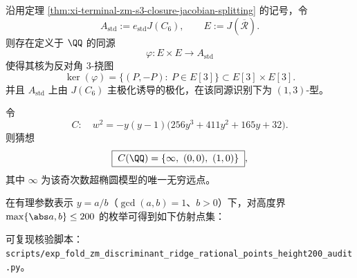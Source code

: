 \begin{conjecture}[标准因子的图核极化刚性]\label{conj:xi-terminal-zm-standard-factor-graph-kernel-3torsion}
沿用定理 \ref{thm:xi-terminal-zm-s3-closure-jacobian-splitting} 的记号，令
\[
A_{\mathrm{std}}:=e_{\mathrm{std}}J(C_6),\qquad
E:=J(\overline{\mathcal R}).
\]
则存在定义于 \(\QQ\) 的同源
\[
\varphi:E\times E\longrightarrow A_{\mathrm{std}}
\]
使得其核为反对角 \(3\)-挠图
\[
\ker(\varphi)=\{(P,-P):\ P\in E[3]\}\subset E[3]\times E[3].
\]
并且 \(A_{\mathrm{std}}\) 上由 \(J(C_6)\) 主极化诱导的极化，在该同源识别下为 \((1,3)\)-型。
\end{conjecture}

\begin{conjecture}[判别式二次脊曲线的有理点完全刻画]\label{conj:xi-terminal-zm-discriminant-ridge-rational-points}
令
\[
C:\quad w^{2}=-y(y-1)\bigl(256y^{3}+411y^{2}+165y+32\bigr).
\]
则猜想
\[
\boxed{\;
C(\QQ)=\{\infty,\ (0,0),\ (1,0)\}\; },
\]
其中 \(\infty\) 为该奇次数超椭圆模型的唯一无穷远点。
\end{conjecture}

\begin{remark}[有限高度穷举证据]\label{rem:xi-terminal-zm-discriminant-ridge-rational-points-height-audit}
在有理参数表示 \(y=a/b\)（\(\gcd(a,b)=1\)、\(b>0\)）下，对高度界 \(\max\{\abs a,b\}\le 200\) 的枚举可得到如下仿射点集：

可复现核验脚本：\texttt{scripts/exp\_fold\_zm\_discriminant\_ridge\_rational\_points\_height200\_audit.py}。
\end{remark}

\endinput
